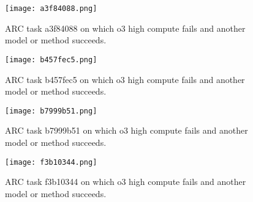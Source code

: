 \begin{figure}[H]
    \centering
    \texttt{[image: a3f84088.png]}
    \label{fig:ARCeval}
    \caption{ARC task a3f84088 on which o3 high compute fails and another model or method succeeds.}
\end{figure}

\begin{figure}[H]
    \centering
    \texttt{[image: b457fec5.png]}
    \label{fig:ARCeval}
    \caption{ARC task b457fec5 on which o3 high compute fails and another model or method succeeds.}
\end{figure}

\begin{figure}[H]
    \centering
    \texttt{[image: b7999b51.png]}
    \label{fig:ARCeval}
    \caption{ARC task b7999b51 on which o3 high compute fails and another model or method succeeds.}
\end{figure}

\begin{figure}[H]
    \centering
    \texttt{[image: f3b10344.png]}
    \label{fig:ARCeval}
    \caption{ARC task f3b10344 on which o3 high compute fails and another model or method succeeds.}
\end{figure}


